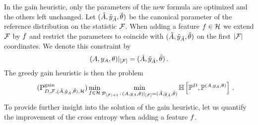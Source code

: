 In the gain heuristic, only the parameters of the new formula are optimized and the others left unchanged.
Let $(\tilde{A},\tilde{y}_{\tilde{A}},\tilde{\theta})$ be the canonical parameter of the reference distribution on the statistic $\mathcal{F}$.
When adding a feature $f\in\mathcal{H}$ we extend $\mathcal{F}$ by $f$ and restrict the parameters to coincide with $(\tilde{A},\tilde{y}_{\tilde{A}},\tilde{\theta})$ on the first $\left|\mathcal{F}\right|$ coordinates.
We denote this constraint by
\begin{align*}
    {(A,y_{A},\theta)}|_{[\mathcal{F}]} = (\tilde{A},\tilde{y}_{\tilde{A}},\tilde{\theta}) \, .
\end{align*}
The greedy gain heuristic is then the problem
\begin{align}
    \label{prob:greedyGain}\tag{$\probtagtypeinst{\gainsymbol}{\datamap,\formulaset,\sechybridparam,\greedyhypothesis}$}
    \min_{\formula\in\greedyhypothesis} \min_{\hybridparamsetofdim{\cardof{\hlnstat}+1} \wcols \restrictionofto{\hybridparam}{[\hlnstat]} = \sechybridparam }
    \centropyof{\empdistribution}{\probof{\hybridparam}} \, .
\end{align}
To provide further insight into the solution of the gain heuristic, let us quantify the improvement of the cross entropy when adding a feature $f$.

